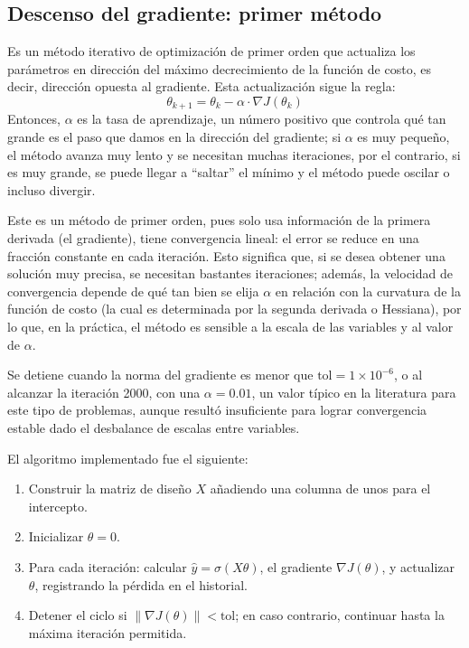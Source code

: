 \subsection{Descenso del gradiente: primer método}
Es un método iterativo de optimización de primer orden que actualiza los parámetros en dirección del máximo decrecimiento de la función de costo, es decir, dirección opuesta al gradiente. Esta actualización sigue la regla:
\begin{equation}
\theta_{k+1} = \theta_k - \alpha \cdot \nabla J(\theta_k)
\end{equation}
Entonces, $\alpha$ es la tasa de aprendizaje, un número positivo que controla qué tan grande es el paso que damos en la dirección del gradiente; si $\alpha$ es muy pequeño, el método avanza muy lento y se necesitan muchas iteraciones, por el contrario, si es muy grande, se puede llegar a “saltar” el mínimo y el método puede oscilar o incluso divergir.

Este es un método de primer orden, pues solo usa información de la primera derivada (el gradiente), tiene convergencia lineal: el error se reduce en una fracción constante en cada iteración. Esto significa que, si se desea obtener una solución muy precisa, se necesitan bastantes iteraciones; además, la velocidad de convergencia depende de qué tan bien se elija $\alpha$ en relación con la curvatura de la función de costo (la cual es determinada por la segunda derivada o Hessiana), por lo que, en la práctica, el método es sensible a la escala de las variables y al valor de $\alpha$.

Se detiene cuando la norma del gradiente es menor que $\text{tol} = 1 \times 10^{-6}$, o al alcanzar la iteración 2000, con una $\alpha = 0.01$, un valor típico en la literatura para este tipo de problemas, aunque resultó insuficiente para lograr convergencia estable dado el desbalance de escalas entre variables.

El algoritmo implementado fue el siguiente:
\begin{enumerate}
    \item Construir la matriz de diseño $X$ añadiendo una columna de unos para el intercepto.
    \item Inicializar $\theta = 0$.
    \item Para cada iteración: calcular $\hat{y} = \sigma(X\theta)$, el gradiente $\nabla J(\theta)$, y actualizar $\theta$, registrando la pérdida en el historial.
    \item Detener el ciclo si $\|\nabla J(\theta)\| < \text{tol}$; en caso contrario, continuar hasta la máxima iteración permitida.
\end{enumerate}

